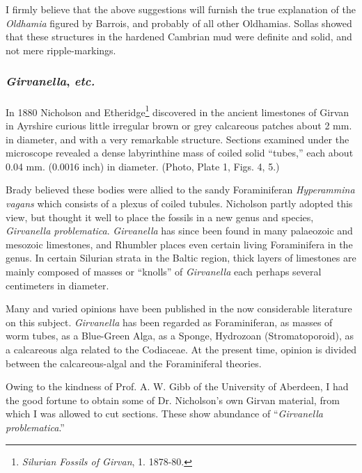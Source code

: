 \documentclass[a4paper, 12pt, oneside]{article}
\begin{document}
I firmly believe that the above suggestions will furnish the true explanation of the \emph{Oldhamia} figured by Barrois, and probably of all other Oldhamias. Sollas showed that these structures in the hardened Cambrian mud were definite and solid, and not mere ripple-markings.

\subsubsection{\emph{Girvanella}, \emph{etc.}}
\paragraph{}
In 1880 Nicholson and Etheridge\footnote{\emph{Silurian Fossils of Girvan}, 1. 1878-80.} discovered in the ancient limestones of Girvan in Ayrshire curious little irregular brown or grey calcareous patches about 2 mm. in diameter, and with a very remarkable structure. Sections examined under the microscope revealed a dense labyrinthine mass of coiled solid ``tubes,'' each about 0.04 mm. (0.0016 inch) in diameter. (Photo, Plate 1, Figs. 4, 5.)

Brady believed these bodies were allied to the sandy Foraminiferan \emph{Hyperammina vagans} which consists of a plexus of coiled tubules. Nicholson partly adopted this view, but thought it well to place the fossils in a new genus and species, \emph{Girvanella problematica}. \emph{Girvanella} has since been found in many palaeozoic and mesozoic limestones, and Rhumbler places even certain living Foraminifera in the genus. In certain Silurian strata in the Baltic region, thick layers of limestones are mainly composed of masses or ``knolls'' of \emph{Girvanella} each perhaps several centimeters in diameter.

Many and varied opinions have been published in the now considerable literature on this subject. \emph{Girvanella} has been regarded as Foraminiferan, as masses of worm tubes, as a Blue-Green Alga, as a Sponge, Hydrozoan (Stromatoporoid), as a calcareous alga related to the Codiaceae. At the present time, opinion is divided between the calcareous-algal and the Foraminiferal theories.

Owing to the kindness of Prof. A. W. Gibb of the University of Aberdeen, I had the good fortune to obtain some of Dr. Nicholson's own Girvan material, from which I was allowed to cut sections. These show abundance of ``\emph{Girvanella problematica}.''
\end{document}
